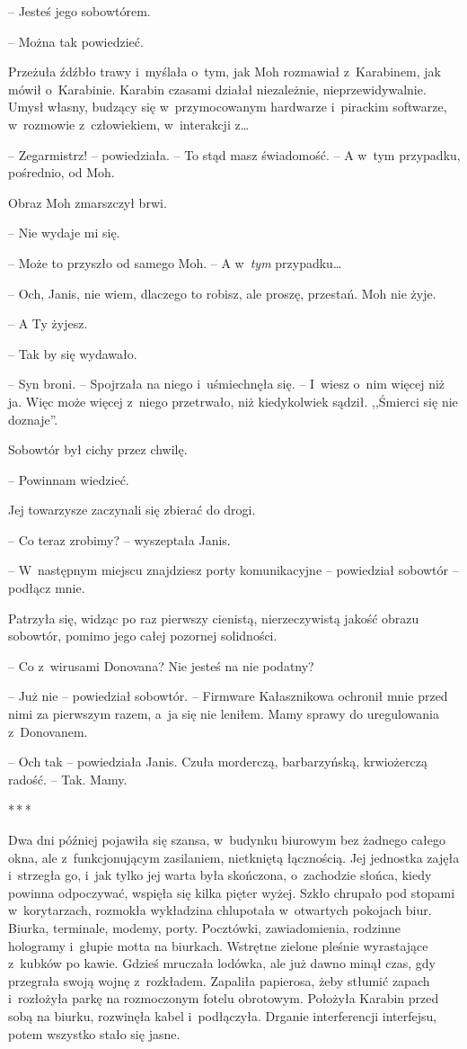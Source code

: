 \documentclass[oneside,polish,11pt,sfheadings]{mwbk}
\newcommand{\threeast}{\bigskip\par\centerline{*\,*\,*}\medskip\par}%
\begin{document}
-- Jesteś jego sobowtórem.

-- Można tak powiedzieć.

Przeżuła źdźbło trawy i~myślała o~tym, jak Moh rozmawiał z~Karabinem,
jak mówił o~Karabinie. Karabin czasami działał niezależnie,
nieprzewidywalnie. Umysł własny, budzący się w~przymocowanym hardwarze i~pirackim softwarze, w~rozmowie z~człowiekiem, w~interakcji z\ldots

-- Zegarmistrz! -- powiedziała. -- To stąd masz świadomość. -- A w~tym
przypadku, pośrednio, od Moh.

Obraz Moh zmarszczył brwi. 

-- Nie wydaje mi się.

-- Może to przyszło od samego Moh. -- A w~\emph{tym} przypadku\ldots

-- Och, Janis, nie wiem, dlaczego to robisz, ale proszę, przestań. Moh
nie żyje.

-- A Ty żyjesz.

-- Tak by się wydawało.

-- Syn broni. -- Spojrzała na niego i~uśmiechnęła się. -- I~wiesz o~nim
więcej niż ja. Więc może więcej z~niego przetrwało, niż kiedykolwiek
sądził. ,,Śmierci się nie doznaje''.

Sobowtór był cichy przez chwilę. 

-- Powinnam wiedzieć.

Jej towarzysze zaczynali się zbierać do drogi.

-- Co teraz zrobimy? -- wyszeptała Janis.

-- W~następnym miejscu znajdziesz porty komunikacyjne -- powiedział
sobowtór -- podłącz mnie.

Patrzyła się, widząc po raz pierwszy cienistą, nierzeczywistą jakość
obrazu sobowtór, pomimo jego całej pozornej solidności. 

-- Co z~wirusami
Donovana? Nie jesteś na nie podatny?

-- Już nie -- powiedział sobowtór. -- Firmware Kałasznikowa ochronił mnie
przed nimi za pierwszym razem, a~ja się nie leniłem. Mamy sprawy do
uregulowania z~Donovanem.

-- Och tak -- powiedziała Janis. Czuła morderczą, barbarzyńską,
krwiożerczą radość. -- Tak. Mamy.
  \threeast 

Dwa dni później pojawiła się szansa, w~budynku biurowym bez żadnego
całego okna, ale z~funkcjonującym zasilaniem, nietkniętą łącznością. Jej
jednostka zajęła i~strzegła go, i~jak tylko jej warta była skończona, o~zachodzie słońca, kiedy powinna odpoczywać, wspięła się kilka pięter
wyżej. Szkło chrupało pod stopami w~korytarzach, rozmokła wykładzina
chlupotała w~otwartych pokojach biur. Biurka, terminale, modemy, porty.
Pocztówki, zawiadomienia, rodzinne hologramy i~głupie motta na biurkach.
Wstrętne zielone pleśnie wyrastające z~kubków po kawie. Gdzieś mruczała
lodówka, ale już dawno minął czas, gdy przegrała swoją wojnę z~rozkładem. Zapaliła papierosa, żeby stłumić zapach i~rozłożyła parkę na
rozmoczonym fotelu obrotowym. Położyła Karabin przed sobą na biurku,
rozwinęła kabel i~podłączyła. Drganie interferencji interfejsu, potem
wszystko stało się jasne.
\end{document}
